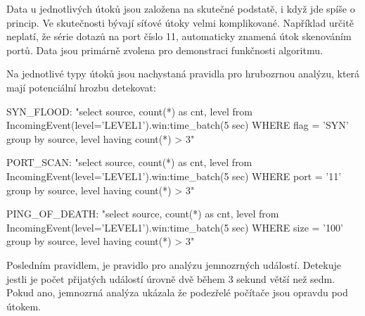 \documentclass[
  digital, %
  table,   %
  nolof,     %
  nolot,     %
  oneside, %
  nocover,
  monochrome,
  12pt
]{fithesis3}
\begin{document}
Data u jednotlivých útoků jsou založena na skutečné podstatě, i když jde spíše o princip. Ve skutečnosti bývají síťové útoky velmi komplikované. Například určitě neplatí, že série dotazů na port číslo 11, automaticky znamená útok skenováním portů. Data jsou primárně zvolena pro demonstraci funkčnosti algoritmu.

Na jednotlivé typy útoků jsou nachystaná pravidla pro hrubozrnou analýzu, která mají potenciální hrozbu detekovat:

\begin{center}
\begin{minipage}[H]{\linewidth}
	\begin{mylisting}
SYN_FLOOD: "select source, count(*) as cnt, level from
IncomingEvent(level='LEVEL1').win:time_batch(5 sec) WHERE
flag = 'SYN' group by source, level having count(*) > 3"
	\end{mylisting}
	\label{fig:syn_flood_rule} 
\end{minipage}
\end{center}

\begin{center}
\begin{minipage}[H]{\linewidth}
	\begin{mylisting}
PORT_SCAN: "select source, count(*) as cnt, level from
IncomingEvent(level='LEVEL1').win:time_batch(5 sec) WHERE
port = '11' group by source, level having count(*) > 3"
	\end{mylisting}
	\label{fig:port_scan_rule} 
\end{minipage}
\end{center}

\begin{center}
\begin{minipage}[H]{\linewidth}
	\begin{mylisting}
PING_OF_DEATH: "select source, count(*) as cnt, level from
IncomingEvent(level='LEVEL1').win:time_batch(5 sec) WHERE
size = '100' group by source, level having count(*) > 3"
	\end{mylisting}
	\label{fig:ping_of_death_rule} 
\end{minipage}
\end{center}

Posledním pravidlem, je pravidlo pro analýzu jemnozrných událostí. Detekuje jestli je počet přijatých událostí úrovně dvě během 3 sekund větší než sedm. Pokud ano, jemnozrná analýza ukázala že podezřelé počítače jsou opravdu pod útokem.
\end{document}
